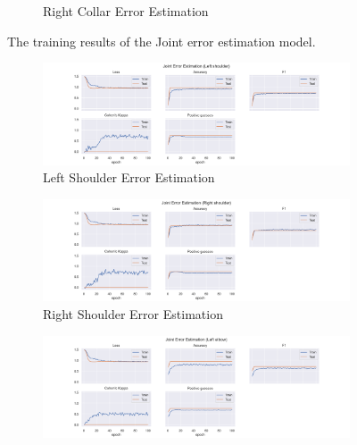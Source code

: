 \begin{figure}
\begin{subfigure}[b]{0.47\linewidth}
      \caption{Right Collar Error Estimation}
      \label{fig:rico_jt_ee}
  \end{subfigure}
  \caption[Joint model training results]{The training results of the Joint error estimation model.}
  \label{fig:Joint_training_results}
\end{figure}


\begin{figure}
  \centering
  \begin{subfigure}[b]{0.47\linewidth}
      \centering
      \includegraphics[width=\textwidth]{figures/Results/jt/JointErrorEstimation_Left shoulder.png}
      \caption{Left Shoulder Error Estimation}
      \label{fig:lesh_jt_ee}
  \end{subfigure}
  \hfill
  \begin{subfigure}[b]{0.47\linewidth}
      \centering
      \includegraphics[width=\textwidth]{figures/Results/jt/JointErrorEstimation_Right shoulder.png}
      \caption{Right Shoulder Error Estimation}
      \label{fig:rish_jt_ee}
  \end{subfigure}
  \hfill
  \begin{subfigure}[b]{0.47\linewidth}
      \centering
      \includegraphics[width=\textwidth]{figures/Results/jt/JointErrorEstimation_Left elbow.png}

\end{subfigure}
\end{figure}
